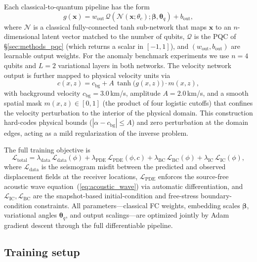 Each classical-to-quantum pipeline has the form
\begin{equation}
    g(\mathbf{x}) = w_\text{out}\, \mathcal{Q}\!\left(\mathcal{N}(\mathbf{x}; \theta_c); \boldsymbol{\beta}, \boldsymbol{\theta}_q\right) + b_\text{out},
\end{equation}
where $\mathcal{N}$ is a classical fully-connected tanh sub-network that maps $\mathbf{x}$ to an $n$-dimensional latent vector matched to the number of qubits, $\mathcal{Q}$ is the PQC of \S\ref{sec:methods_pqc} (which returns a scalar in $[-1,1]$), and $(w_\text{out}, b_\text{out})$ are learnable output weights. For the anomaly benchmark experiments we use $n = 4$ qubits and $L = 2$ variational layers in both networks. The velocity network output is further mapped to physical velocity units via
\begin{equation}
    c(x,z) = c_\text{bg} + A\, \tanh\!\big(g(x,z)\big) \cdot m(x,z),
    \label{eq:velocity_output}
\end{equation}
with background velocity $c_\text{bg} = 3.0$\,km/s, amplitude $A = 2.0$\,km/s, and a smooth spatial mask $m(x,z) \in [0,1]$ (the product of four logistic cutoffs) that confines the velocity perturbation to the interior of the physical domain. This construction hard-codes physical bounds ($|\alpha - c_\text{bg}| \leq A$) and zero perturbation at the domain edges, acting as a mild regularization of the inverse problem.

The full training objective is
\begin{equation}
\mathcal{L}_\text{total}
= \lambda_\text{data}\,\mathcal{L}_\text{data}(\phi)
+ \lambda_\text{PDE}\,\mathcal{L}_\text{PDE}(\phi, c)
+ \lambda_\text{BC}\,\mathcal{L}_\text{BC}(\phi)
+ \lambda_\text{IC}\,\mathcal{L}_\text{IC}(\phi),
\end{equation}
where $\mathcal{L}_\text{data}$ is the seismogram misfit between the predicted and observed displacement fields at the receiver locations, $\mathcal{L}_\text{PDE}$ enforces the source-free acoustic wave equation~(\ref{eq:acoustic_wave}) via automatic differentiation, and $\mathcal{L}_\text{IC}, \mathcal{L}_\text{BC}$ are the snapshot-based initial-condition and free-stress boundary-condition constraints. All parameters---classical FC weights, embedding scales $\boldsymbol{\beta}$, variational angles $\boldsymbol{\theta}_q$, and output scalings---are optimized jointly by Adam gradient descent through the full differentiable pipeline.



\subsection{Training setup}
\label{sec:methods_training}


